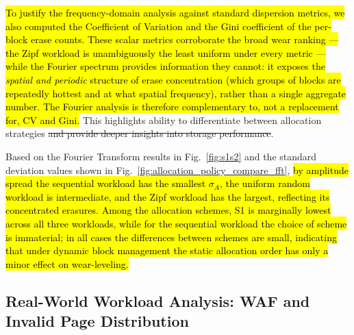 \documentclass{ieeeaccess}
\begin{document}
\hl{To justify the frequency-domain analysis against standard dispersion metrics, we also computed the Coefficient of Variation and the Gini coefficient of the per-block erase counts. These scalar metrics corroborate the broad wear ranking --- the Zipf workload is unambiguously the least uniform under every metric --- while the Fourier spectrum provides information they cannot: it exposes the \emph{spatial and periodic} structure of erase concentration (which groups of blocks are repeatedly hottest and at what spatial frequency), rather than a single aggregate number. The Fourier analysis is therefore complementary to, not a replacement for, CV and Gini.}
This highlights \eyanassdsim ability to differentiate between allocation strategies\sout{ and provide deeper insights into storage performance}.


Based on the Fourier Transform results in Fig.~\ref{fig:s1s2} and the standard deviation values shown in Fig.~\ref{fig:allocation_policy_compare_fft}, \hl{by amplitude spread the sequential workload has the smallest $\sigma_A$, the uniform random workload is intermediate, and the Zipf workload has the largest, reflecting its concentrated erasures. Among the allocation schemes, S1 is marginally lowest across all three workloads, while for the sequential workload the choice of scheme is immaterial; in all cases the differences between schemes are small, indicating that under dynamic block management the static allocation order has only a minor effect on wear-leveling.}

\subsection{Real-World Workload Analysis: WAF and Invalid Page Distribution}
\end{document}
